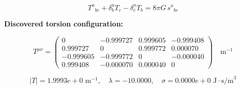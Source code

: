 
\begin{equation}
  T^a{}_{bc} + \delta^a_b T_c - \delta^a_c T_b = 8\pi G \, s^a{}_{bc}
\end{equation}

\textbf{Discovered torsion configuration:}

\begin{equation}
  T^{\mu\nu} = \begin{pmatrix}
    0 & -0.999727 & 0.999605 & -0.999408 \\
    0.999727 & 0 & 0.999772 & 0.000070 \\
    -0.999605 & -0.999772 & 0 & -0.000040 \\
    0.999408 & -0.000070 & 0.000040 & 0
  \end{pmatrix} \quad \text{m}^{-1}
\end{equation}

\begin{equation}
  |T| = 1.9993e+0 \text{ m}^{-1}, \quad
  \lambda = -10.0000, \quad
  \sigma = 0.0000e+0 \text{ J}\cdot\text{s/m}^3
\end{equation}
